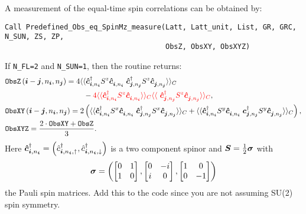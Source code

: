 A measurement of the equal-time spin correlations can be obtained by:
\begin{lstlisting}[style=fortran]
Call Predefined_Obs_eq_SpinMz_measure(Latt, Latt_unit, List, GR, GRC, N_SUN, ZS, ZP,
                                      ObsZ, ObsXY, ObsXYZ)
\end{lstlisting}
If \texttt{N\_FL=2} and \texttt{N\_SUN=1}, then the routine returns:
\begin{align}
&\texttt{ObsZ}\left(\ve{i}-\ve{j}, n_{\ve{i}},  n_{\ve{j}} \right)  =  \begin{multlined}[t]  4 \langle \langle \ve{\hat{c}}^{\dagger}_{\ve{i}, n_{\ve{i}}} S^z \ve{\hat{c}}^{\phantom\dagger}_{\ve{i}, n_{\ve{i}} }   \;  \ve{\hat{c}}^{\dagger}_{\ve{j}, n_{\ve{j}}} S^z  \ve{\hat{c}}^{\phantom\dagger}_{\ve{j}, n_{\ve{j}}}\rangle \rangle_{C} \\
-   {\color{red} 4 \langle \langle \ve{\hat{c}}^{\dagger}_{\ve{i}, n_{\ve{i}}} S^z \ve{\hat{c}}^{\phantom\dagger}_{\ve{i}, n_{\ve{i}} } \rangle \rangle_{C}  \langle \langle \  \ve{\hat{c}}^{\dagger}_{\ve{j}, n_{\ve{j}}} S^z  \ve{\hat{c}}^{\phantom\dagger}_{\ve{j}, n_{\ve{j}}}\rangle \rangle_{C} },  \end{multlined} \nonumber \\  
&\texttt{ObsXY}\left(\ve{i}-\ve{j}, n_{\ve{i}},  n_{\ve{j}} \right)  =  2 \left( \langle \langle \ve{\hat{c}}^{\dagger}_{\ve{i}, n_{\ve{i}}} S^x \ve{\hat{c}}^{\phantom\dagger}_{\ve{i}, n_{\ve{i}} }   \;  \ve{\hat{c}}^{\dagger}_{\ve{j}, n_{\ve{j}}} S^x  
\ve{\hat{c}}^{\phantom\dagger}_{\ve{j}, n_{\ve{j}}}\rangle \rangle_{C}  +
\langle \langle \ve{\hat{c}}^{\dagger}_{\ve{i}, n_{\ve{i}}} S^y \ve{\hat{c}}^{\phantom\dagger}_{\ve{i}, n_{\ve{i}} }   \;  \ve{c}^{\dagger}_{\ve{j}, n_{\ve{j}}} S^y  \ve{\hat{c}}^{\phantom\dagger}_{\ve{j}, n_{\ve{j}}}\rangle \rangle_{C}  \right), \nonumber \\
&\texttt{ObsXYZ} =  \frac{2\cdot\texttt{ObsXY} + \texttt{ObsZ}}{3}.
\end{align}
Here  $\boldsymbol{\hat{c}}^{\dagger}_{\boldsymbol{i}, n_{\boldsymbol{i}}} =  \left( \hat{c}^{\dagger}_{\boldsymbol{i}, n_{\boldsymbol{i}},\uparrow},  \hat{c}^{\dagger}_{\boldsymbol{i}, n_{\boldsymbol{i}},\downarrow} \right) $ is a two  component spinor  and    $ \boldsymbol{S}  = \frac{1}{2} \boldsymbol{\sigma}$  
with
\begin{equation}
\boldsymbol{\sigma}   = \left(
\begin{bmatrix} 
0 & 1 \\
1 & 0 
\end{bmatrix},
\begin{bmatrix} 
0 & -i \\
i & 0 
\end{bmatrix},
\begin{bmatrix} 
1 & 0 \\
0 & -1 
\end{bmatrix}
\right) \label{eq:vecPaulimat}
 \end{equation}
 the Pauli spin  matrices. 
 {\color{red}  Add this to the code since you are not assuming SU(2) spin symmetry.}

